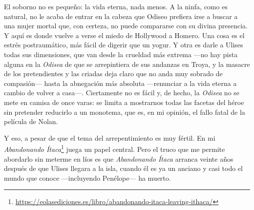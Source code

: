 \documentclass[11pt,a4paper]{article}
\begin{document}
El soborno no es pequeño: la vida eterna, nada menos. A la ninfa, como es natural, no le acaba de entrar en la cabeza que Odiseo prefiera irse a buscar a una mujer mortal que, con certeza, no puede compararse con su divina presencia. Y aquí es donde vuelve a verse el miedo de Hollywood a Homero. Una cosa es el estrés postraumático, más fácil de digerir que un yogur. Y otra es darle a Ulises todas sus dimensiones, que van desde la crueldad más extrema ---no hay pista alguna en la \emph{Odisea} de que se arrepintiera de sus andanzas en Troya, y la masacre de los pretendientes y las criadas deja claro que no anda muy sobrado de compasión--- hasta la abnegación más absoluta ---renunciar a la vida eterna a cambio de volver a casa---. Ciertamente no es fácil y, de hecho, la \emph{Odisea} no se mete en camisa de once varas: se limita a mostrarnos todas las facetas del héroe sin pretender reducirlo a un monotema, que es, en mi opinión, el fallo fatal de la película de Nolan.

Y eso, a pesar de que el tema del arrepentimiento es muy fértil. En mi \emph{Abandonando Ítaca}\footnote{\url{https://eolasediciones.es/libro/abandonando-itaca-leaving-ithaca/}} juega un papel central. Pero el truco que me permite abordarlo sin meterme en líos es que \emph{Abandonando Ítaca} arranca veinte años después de que Ulises llegara a la isla, cuando él es ya un anciano y casi todo el mundo que conoce ---incluyendo Penélope--- ha muerto.
\end{document}
